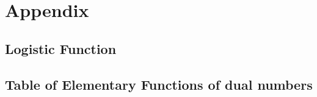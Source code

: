 
\chapter{Appendix}
\section{Logistic Function}
\section{Table of Elementary Functions of dual numbers}
